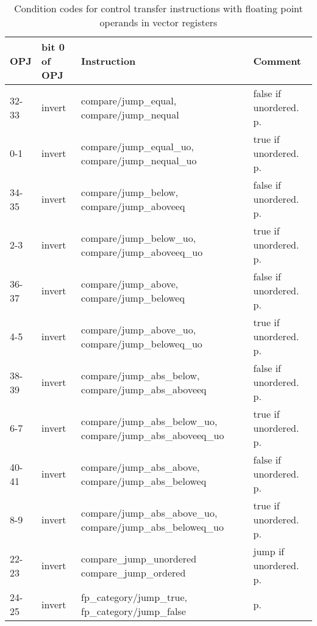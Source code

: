 \documentclass[forwardcom.tex]{subfiles}
\begin{document}
\begin{longtable}
{|p{10mm}|p{14mm}|p{65mm}|p{40mm}|}
\caption{Condition codes for control transfer instructions with floating point operands in vector registers }
\label{table:controlTransferInstructionsFloat}
\endfirsthead
\endhead
\hline
OPJ & bit 0 \newline of OPJ & Instruction & Comment \\
\hline
32-33 & invert & compare/jump\_equal, \newline compare/jump\_nequal & false if unordered. p. \pageref{table:floatCompareJumpInstructions} \\
\hline
0-1 & invert & compare/jump\_equal\_uo, \newline compare/jump\_nequal\_uo & true if unordered. p. \pageref{table:floatCompareJumpInstructions} \\
\hline
34-35 & invert & compare/jump\_below, \newline compare/jump\_aboveeq & false if unordered. p. \pageref{table:floatCompareJumpInstructions} \\
\hline
2-3 & invert & compare/jump\_below\_uo, \newline compare/jump\_aboveeq\_uo & true if unordered. p. \pageref{table:floatCompareJumpInstructions} \\
\hline
36-37 & invert & compare/jump\_above, \newline compare/jump\_beloweq & false if unordered. p. \pageref{table:floatCompareJumpInstructions} \\
\hline
4-5 & invert & compare/jump\_above\_uo, \newline compare/jump\_beloweq\_uo & true if unordered. p. \pageref{table:floatCompareJumpInstructions} \\
\hline
38-39 & invert & compare/jump\_abs\_below, \newline compare/jump\_abs\_aboveeq & false if unordered. p. \pageref{table:floatCompareJumpInstructions} \\
\hline
6-7 & invert & compare/jump\_abs\_below\_uo, \newline compare/jump\_abs\_aboveeq\_uo & true if unordered. p. \pageref{table:floatCompareJumpInstructions} \\
\hline
40-41 & invert & compare/jump\_abs\_above, \newline compare/jump\_abs\_beloweq & false if unordered. p. \pageref{table:floatCompareJumpInstructions} \\
\hline
8-9 & invert & compare/jump\_abs\_above\_uo, \newline compare/jump\_abs\_beloweq\_uo & true if unordered. p. \pageref{table:floatCompareJumpInstructions} \\
\hline
22-23 & invert & compare\_jump\_unordered \newline compare\_jump\_ordered
& jump if unordered. p. \pageref{table:floatCompareJumpInstructions} \\
\hline
24-25 & invert & fp\_category/jump\_true, \newline fp\_category/jump\_false &  p. \pageref{table:floatCompareJumpInstructions}\\
\hline


\end{longtable}
\end{document}
